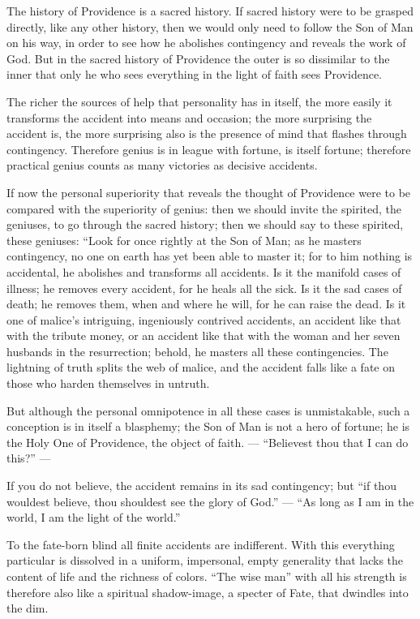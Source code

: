 \documentclass[12pt,a4paper,openany]{book}
\newcommand{\opage}[1]{\marginnote{\footnotesize\textit{[#1]}}}
\begin{document}
The history of Providence is a sacred history.
If sacred history were to be grasped directly,
like any other history, then
we would only need to follow the Son of Man on his
way, in order to see how he abolishes
\setcounter{footnote}{0}%
\opage{37}contingency and reveals the work of God.
But in the sacred history of Providence the outer is
so dissimilar to the inner that only he who
sees everything in the light of faith sees Providence.

The richer the sources of help that personality has
in itself, the more easily it transforms the accident
into means and occasion; the more surprising
the accident is, the more surprising also is
the presence of mind that flashes through contingency.
Therefore genius is in league with
fortune, is itself fortune; therefore practical
genius counts as many victories as
decisive accidents.

If now the personal superiority
that reveals the thought of Providence were to be compared
with the superiority of genius: then we should
invite the spirited, the geniuses, to
go through the sacred history; then we should
say to these spirited, these geniuses: ``Look
for once rightly at the Son of Man; as he
masters contingency, no one on
earth has yet been able to master it; for to him nothing is
accidental, he abolishes and transforms all
accidents. Is it the manifold cases of illness;
he removes every accident, for he
\setcounter{footnote}{0}%
\opage{38}heals all the sick. Is it the sad
cases of death; he removes them, when and
where he will, for he can raise the dead.
Is it one of malice's intriguing, ingeniously
contrived accidents, an accident like that with the tribute
money, or an accident like that with the woman
and her seven husbands in the resurrection; behold,
he masters all these contingencies. The lightning
of truth splits the web of malice, and the accident
falls like a fate on those who
harden themselves in untruth.

But although the personal omnipotence
in all these cases is unmistakable,
such a conception is in itself a blasphemy;
the Son of Man is not a hero of
fortune; he is the Holy One of Providence, the object of faith.
--- ``Believest thou that I can do this?'' ---

If you do not believe, the accident remains
in its sad contingency; but ``if
thou wouldest believe, thou shouldest see the glory
of God.''
--- ``As long as I am in the world, I am the light of the world.''

To the fate-born blind all finite
accidents are indifferent. With this everything
\setcounter{footnote}{0}%
\opage{39}particular is dissolved in a uniform, impersonal, empty generality
that lacks the content of life and
the richness of colors. ``The wise man'' with all his
strength is therefore also like a spiritual shadow-image,
a specter of Fate, that dwindles into
the dim.
\end{document}
